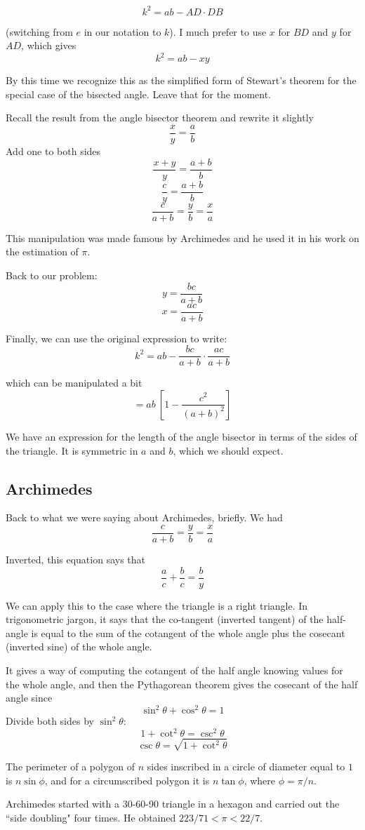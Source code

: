 \documentclass[11pt, oneside]{article}
\begin{document}
\[ k^2 = ab - AD \cdot DB \]

(switching from $e$ in our notation to $k$).  I much prefer to use $x$ for $BD$ and $y$ for $AD$, which gives
\[ k^2 = ab - xy \]

By this time we recognize this as the simplified form of Stewart's theorem for the special case of the bisected angle.  Leave that for the moment.  

Recall the result from the angle bisector theorem and rewrite it slightly
\[ \frac{x}{y} = \frac{a}{b} \]
Add one to both sides
\[ \frac{x + y}{y} = \frac{a + b}{b} \]
\[ \frac{c}{y} = \frac{a + b}{b} \]
\[ \frac{c}{a + b} = \frac{y}{b} = \frac{x}{a} \]

This manipulation was made famous by Archimedes and he used it in his work on the estimation of $\pi$.  

Back to our problem:
\[ y = \frac{bc}{a + b} \]
\[ x = \frac{ac}{a + b} \]

Finally, we can use the original expression to write:
\[ k^2 = ab -  \frac{bc}{a + b} \cdot \frac{ac}{a + b} \]

which can be manipulated a bit  
\[ = ab \ [1 - \frac{c^2}{(a + b)^2}] \]

We have an expression for the length of the angle bisector in terms of the sides of the triangle.  It is symmetric in $a$ and $b$, which we should expect.

\subsection*{Archimedes}

Back to what we were saying about Archimedes, briefly.  We had
\[ \frac{c}{a + b} = \frac{y}{b} = \frac{x}{a} \]

Inverted, this equation says that 
\[ \frac{a}{c} + \frac{b}{c} = \frac{b}{y} \]

We can apply this to the case where the triangle is a right triangle.  In trigonometric jargon, it says that the co-tangent (inverted tangent) of the half-angle is equal to the sum of the cotangent of the whole angle plus the cosecant (inverted sine) of the whole angle.

It gives a way of computing the cotangent of the half angle knowing values for the whole angle, and then the Pythagorean theorem gives the cosecant of the half angle since 
\[ \sin^2 \theta + \cos^2 \theta = 1 \]
Divide both sides by $\sin^2 \theta$:
\[ 1 + \cot^2 \theta = \csc^2 \theta \]
\[ \csc \theta = \sqrt{1 + \cot^2 \theta} \]

The perimeter of a polygon of $n$ sides inscribed in a circle of diameter equal to $1$ is $n \sin \phi$, and for a circumscribed polygon it is $n \tan \phi$, where $\phi = \pi/n$.

Archimedes started with a 30-60-90 triangle in a hexagon and carried out the ``side doubling" four times.  He obtained $223/71 < \pi < 22/7 $.
\end{document}

